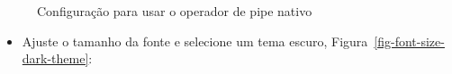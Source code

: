 \documentclass[
  letterpaper,
]{book}
\providecommand{\tightlist}{%
  \setlength{\itemsep}{0pt}\setlength{\parskip}{0pt}}\usepackage{longtable,booktabs,array}
\theoremstyle{definition}
\theoremstyle{plain}
\theoremstyle{remark}
\begin{document}
\begin{figure}


\caption{\label{fig-native-pipe-operator}Configuração para usar o
operador de pipe nativo}

\end{figure}%

\begin{itemize}
\tightlist
\item
  Ajuste o tamanho da fonte e selecione um tema escuro,
  Figura~\ref{fig-font-size-dark-theme}:
\end{itemize}
\end{document}
